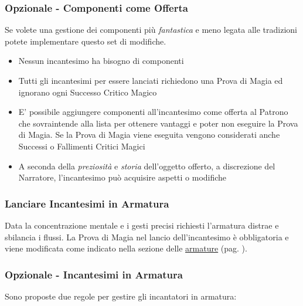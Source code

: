 \begin{multicols}{2}
\subsubsection{Opzionale - Componenti come Offerta}\label{componenticomeofferta}\hypertarget{componenticomeofferta}{}

Se volete una gestione dei componenti più \emph{fantastica} e meno legata alle tradizioni potete implementare questo set di modifiche.

\begin{itemize}[leftmargin=*] \setlength{\itemsep}{0pt}
\item Nessun incantesimo ha bisogno di componenti
\item Tutti gli incantesimi per essere lanciati richiedono una Prova di Magia ed ignorano ogni Successo Critico Magico
\item E' possibile aggiungere componenti all'incantesimo come offerta al Patrono che sovraintende alla lista per ottenere vantaggi e poter non eseguire la Prova di Magia. Se la Prova di Magia viene eseguita vengono considerati anche Successi o Fallimenti Critici Magici
\item A seconda della \emph{preziosità} e \emph{storia} dell'oggetto offerto, a discrezione del Narratore, l'incantesimo può acquisire aspetti o modifiche
\end{itemize}

\subsubsection{Lanciare Incantesimi in Armatura}\label{magielanciareincantesimiinarmatura}

Data la concentrazione mentale e i gesti precisi richiesti l'armatura distrae e sbilancia i flussi. La Prova di Magia nel lancio dell'incantesimo è obbligatoria e viene modificata come indicato nella sezione delle \hyperlink{armatureemagie}{armature} (pag. \pageref{armatureemagie}).

\subsubsection{Opzionale - Incantesimi in Armatura}

Sono proposte due regole per gestire gli incantatori in armatura:


\end{multicols}
